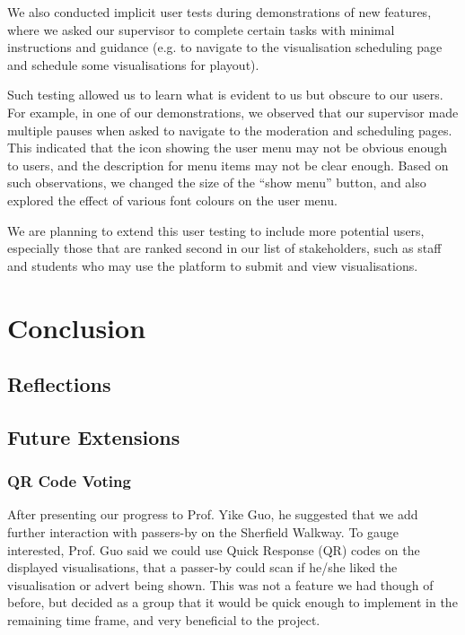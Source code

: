 \documentclass[a4paper, titlepage]{article}
\begin{document}
We also conducted implicit user tests during demonstrations of new features, where we asked our supervisor to complete certain tasks with minimal instructions and guidance (e.g. to navigate to the visualisation scheduling page and schedule some visualisations for playout).

Such testing allowed us to learn what is evident to us but obscure to our users. For example, in one of our demonstrations, we observed that our supervisor made multiple pauses when asked to navigate to the moderation and scheduling pages. This indicated that the icon showing the user menu may not be obvious enough to users, and the description for menu items may not be clear enough. Based on such observations, we changed the size of the ``show menu'' button, and also explored the effect of various font colours on the user menu.

We are planning to extend this user testing to include more potential users, especially those that are ranked second in our list of stakeholders, such as staff and students who may use the platform to submit and 
view visualisations.







\newpage
\section{Conclusion}

\subsection{Reflections}



\subsection{Future Extensions}

\subsubsection{QR Code Voting}
After presenting our progress to Prof. Yike Guo, he suggested that we add further interaction with 
passers-by on the Sherfield Walkway. To gauge interested, Prof. Guo said we could use Quick Response 
(QR) codes on the displayed visualisations, that a passer-by could scan if he/she liked the 
visualisation or advert being shown. This was not a feature we had though of before, but decided as a 
group that it would be quick enough to implement in the remaining time frame, and very beneficial to
the project. 
\end{document}
